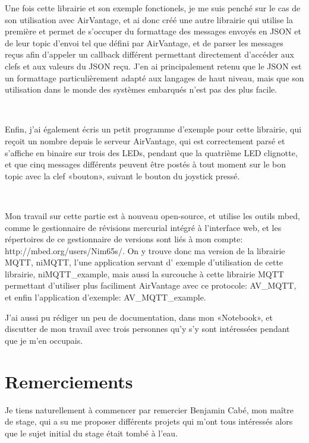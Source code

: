 \documentclass{article}
\begin{document}
Une fois cette librairie et son exemple fonctionels, je me suis penché sur le cas de son utilisation avec AirVantage, et ai donc créé une autre librairie qui utilise la première et permet de s’occuper du formattage des messages envoyés en JSON et de leur topic d’envoi tel que défini par AirVantage, et de parser les messages reçus afin d’appeler un callback différent permettant directement d’accéder aux clefs et aux valeurs du JSON reçu. J’en ai principalement retenu que le JSON est un formattage particulièrement adapté aux langages de haut niveau, mais que son utilisation dans le monde des systèmes embarqués n’est pas des plus facile.

~

Enfin, j’ai également écris un petit programme d’exemple pour cette librairie, qui reçoit un nombre depuis le serveur AirVantage, qui est correctement parsé et s’affiche en binaire sur trois des LEDs, pendant que la quatrième LED clignotte, et que cinq messages différents peuvent être postés à tout moment sur le bon topic avec la clef «bouton», suivant le bouton du joystick pressé.


~

Mon travail sur cette partie est à nouveau open-source, et utilise les outils mbed, comme le gestionnaire de révisions mercurial intégré à l’interface web, et les répertoires de ce gestionnaire de versions sont liés à mon compte: http://mbed.org/users/Nim65s/. On y trouve donc ma version de la librairie MQTT, niMQTT, l’une application servant d’ exemple d’utilisation de cette librairie, niMQTT\_example, mais aussi la surcouche à cette librairie MQTT permettant d’utiliser plus faciliment AirVantage avec ce protocole: AV\_MQTT, et enfin l’application d’exemple: AV\_MQTT\_example.

J’ai aussi pu rédiger un peu de documentation, dans mon «Notebook», et discutter de mon travail avec trois personnes qu’y s’y sont intéressées pendant que je m’en occupais.

\clearpage

\section{Remerciements}

Je tiens naturellement à commencer par remercier Benjamin Cabé, mon maître de stage, qui a su me proposer différents projets qui m’ont tous intéressés alors que le sujet initial du stage était tombé à l’eau.

~
\end{document}
